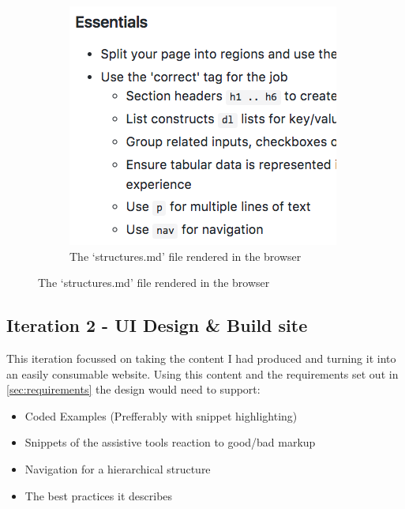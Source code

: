 \begin{figure}[H]
    \qquad
    \begin{subfigure}[b]{0.4\textwidth}
        \includegraphics[width=\textwidth]{figures/documentation_md_example_2}
        \captionsetup{justification=centering}
        \caption{The `structures.md' file rendered in the browser}
        \label{fig:structures}
    \end{subfigure}
\end{figure}

\subsection{Iteration 2 - UI Design \& Build site}
This iteration focussed on taking the content I had produced and turning it
into an easily consumable website. Using this content and the requirements set
out in \ref{sec:requirements} the design would need to support:
\begin{itemize}
\item Coded Examples (Prefferably with snippet highlighting)
\item Snippets of the assistive tools reaction to good/bad markup
\item Navigation for a hierarchical structure
\item The best practices it describes
\end{itemize}

